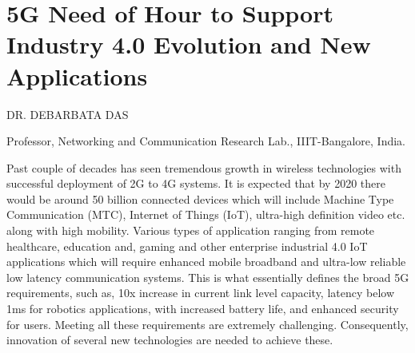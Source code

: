 \chapter{5G Need of Hour to Support Industry 4.0 Evolution and New Applications}

\begin{center}
{\large\uppercase{Dr. Debarbata Das}} 

\vskip -6pt

Professor,  Networking and Communication Research Lab., IIIT-Bangalore, India.
\end{center}

\vfill
\eject

\begin{multicols}{2}
Past couple of decades has seen tremendous growth in wireless technologies with successful deployment of 2G to 4G systems. It is expected that by 2020 there would be around 50 billion connected devices which will include Machine Type Communication (MTC), Internet of Things (IoT), ultra-high definition video etc. along with high mobility. Various types of application ranging from remote healthcare, education and, gaming and other enterprise industrial 4.0 IoT applications which will require enhanced mobile broadband and ultra-low reliable low latency communication systems. This is what essentially defines the broad 5G requirements, such as, 10x increase in current link level capacity, latency below 1ms for robotics applications, with increased battery life, and enhanced security for users. Meeting all these requirements are extremely challenging.  Consequently, innovation of several new technologies are needed to achieve these.


\end{multicols}
